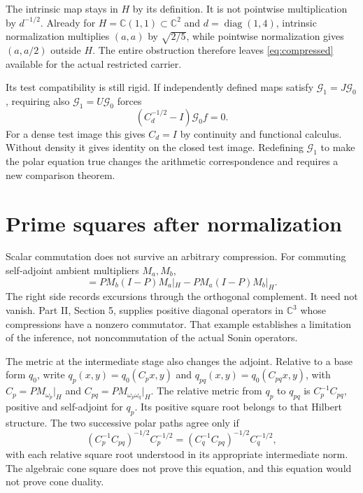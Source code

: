 \documentclass[11pt,letterpaper]{article}
\theoremstyle{definition}
\theoremstyle{remark}
\newcommand{\C}{\mathbb C}
\begin{document}
The intrinsic map stays in $H$ by its definition. It is not
pointwise multiplication by $d^{-1/2}$. Already for
$H=\C(1,1)\subset\C^2$ and $d=\operatorname{diag}(1,4)$,
intrinsic normalization multiplies $(a,a)$ by $\sqrt{2/5}$,
while pointwise normalization gives $(a,a/2)$ outside $H$.
The entire obstruction therefore leaves \eqref{eq:compressed}
available for the actual restricted carrier.

Its test compatibility is still rigid. If independently defined
maps satisfy $\mathcal G_1=J\mathcal G_0$, requiring also
$\mathcal G_1=U\mathcal G_0$ forces
\begin{equation}
 (C_d^{-1/2}-I)\mathcal G_0f=0.
 \label{eq:polar-rigidity}
\end{equation}
For a dense test image this gives $C_d=I$ by continuity and
functional calculus. Without density it gives identity on the
closed test image. Redefining $\mathcal G_1$ to make the polar
equation true changes the arithmetic correspondence and requires
a new comparison theorem.

\section{Prime squares after normalization}

Scalar commutation does not survive an arbitrary compression.
For commuting self-adjoint ambient multipliers $M_a,M_b$,
\begin{equation}
 [PM_a|_H,PM_b|_H]
 =PM_b(I-P)M_a|_H-PM_a(I-P)M_b|_H.
 \label{eq:commutator}
\end{equation}
The right side records excursions through the orthogonal
complement. It need not vanish. Part II, Section 5, supplies
positive diagonal operators in $\C^3$ whose compressions have
a nonzero commutator. That example establishes a limitation of
the inference, not noncommutation of the actual Sonin operators.

The metric at the intermediate stage also changes the adjoint.
Relative to a base form $q_0$, write
$q_p(x,y)=q_0(C_px,y)$ and
$q_{pq}(x,y)=q_0(C_{pq}x,y)$, with
$C_p=PM_{\omega_p}|_H$ and $C_{pq}=PM_{\omega_p\omega_q}|_H$.
The relative metric from $q_p$ to $q_{pq}$ is
$C_p^{-1}C_{pq}$, positive and self-adjoint for $q_p$.
Its positive square root belongs to that Hilbert structure.
The two successive polar paths agree only if
\begin{equation}
 (C_p^{-1}C_{pq})^{-1/2}C_p^{-1/2}
 =(C_q^{-1}C_{pq})^{-1/2}C_q^{-1/2},
 \label{eq:polar-square}
\end{equation}
with each relative square root understood in its appropriate
intermediate norm. The algebraic cone square does not prove
this equation, and this equation would not prove cone duality.
\end{document}
